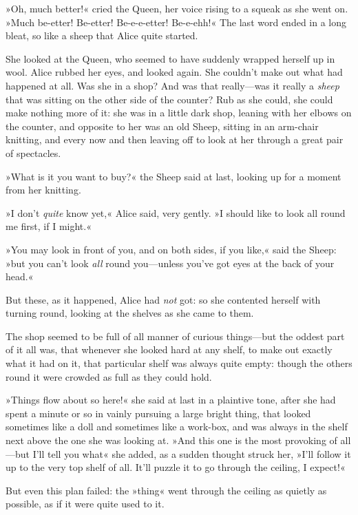 »Oh, much better!« cried the Queen, her voice rising to a squeak as she went on. »Much be-etter! Be-etter! Be-e-e-etter! Be-e-ehh!« The last word ended in a long bleat, so like a sheep that Alice quite started.

She looked at the Queen, who seemed to have suddenly wrapped herself up in wool. \label{black3} Alice rubbed her eyes, and looked again. She couldn't make out what had happened at all. Was she in a shop? And was that really—was it really a \textit{sheep} that was sitting on the other side of the counter? Rub as she could, she could make nothing more of it: she was in a little dark shop, leaning with her elbows on the counter, and opposite to her was an old Sheep, sitting in an arm-chair knitting, and every now and then leaving off to look at her through a great pair of spectacles.

»What is it you want to buy?« the Sheep said at last, looking up for a moment from her knitting.

»I don't \textit{quite} know yet,« Alice said, very gently. »I should like to look all round me first, if I might.«

»You may look in front of you, and on both sides, if you like,« said the Sheep: »but you can't look \textit{all} round you—unless you've got eyes at the back of your head.«

But these, as it happened, Alice had \textit{not} got: so she contented herself with turning round, looking at the shelves as she came to them.

The shop seemed to be full of all manner of curious things—but the oddest part of it all was, that whenever she looked hard at any shelf, to make out exactly what it had on it, that particular shelf was always quite empty: though the others round it were crowded as full as they could hold.

»Things flow about so here!« she said at last in a plaintive tone, after she had spent a minute or so in vainly pursuing a large bright thing, that looked sometimes like a doll and sometimes like a work-box, and was always in the shelf next above the one she was looking at. »And this one is the most provoking of all—but I'll tell you what\longdash« she added, as a sudden thought struck her, »I'll follow it up to the very top shelf of all. It'll puzzle it to go through the ceiling, I expect!«

But even this plan failed: the »thing« went through the ceiling as quietly as possible, as if it were quite used to it.

